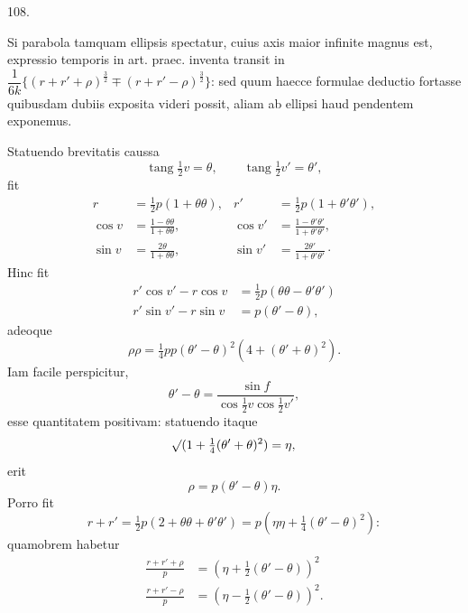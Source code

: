 \par{}\medskip
\hypertarget{native-149-article108}{}
\begin{center}108.\end{center}
Si parabola tamquam ellipsis spectatur, cuius axis maior infinite magnus est, expressio temporis in art. praec. inventa transit in $\dfrac1{6k}\{(r+r'+\rho)^{\frac32}\mp(r+r'-\rho)^{\frac32}\}$: sed quum haecce formulae deductio fortasse quibusdam dubiis exposita videri possit, aliam ab ellipsi haud pendentem exponemus.
\par{}
Statuendo brevitatis caussa
\[
\operatorname{tang}\tfrac12v=\theta,\qquad\operatorname{tang}\tfrac12v'=\theta',
\]
\noindent fit
\[
\begin{aligned}
r&=\tfrac12p(1+\theta\theta),&r'&=\tfrac12p(1+\theta'\theta'),\\[.6em]
\cos v&=\frac{1-\theta\theta}{1+\theta\theta},&\cos v'&=\frac{1-\theta'\theta'}{1+\theta'\theta'},\\[.6em]
\sin v&=\frac{2\theta}{1+\theta\theta},&\sin v'&=\frac{2\theta'}{1+\theta'\theta'}\mathpunct{\cdot}
\end{aligned}
\]
\noindent Hinc fit
\[
\begin{aligned}
r'\cos v'-r\cos v&=\tfrac12p(\theta\theta-\theta'\theta')\\[.6em]
r'\sin v'-r\sin v&=p(\theta'-\theta),
\end{aligned}
\]
\noindent adeoque
\[
\rho\rho=\tfrac14pp(\theta'-\theta)^2(4+(\theta'+\theta)^2).
\]
\noindent Iam facile perspicitur,
\[
\theta'-\theta=\frac{\sin f}{\cos\tfrac12v\cos\tfrac12v'},
\]
\noindent esse quantitatem positivam: statuendo itaque
\[
\mathord{{}^{}\!\surd}(1+\tfrac14(\theta'+\theta)^2)=\eta,
\]
\noindent erit
\[
\rho=p(\theta'-\theta)\eta.
\]
\noindent Porro fit
\[
r+r'=\tfrac12p(2+\theta\theta+\theta'\theta')=p(\eta\eta+\tfrac14(\theta'-\theta)^2):
\]
\noindent quamobrem habetur
\[
\begin{aligned}
\frac{r+r'+\rho}{p}&=(\eta+\tfrac12(\theta'-\theta))^2\\[.6em]
\frac{r+r'-\rho}{p}&=(\eta-\tfrac12(\theta'-\theta))^2.
\end{aligned}
\]

